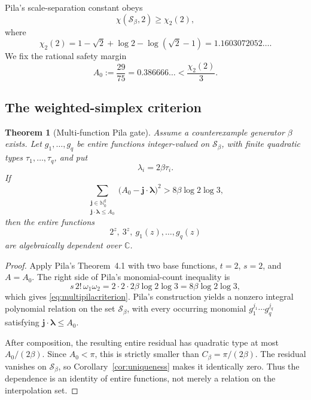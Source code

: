\documentclass[11pt,oneside]{article}
\newtheorem{theorem}{Theorem}[section]
\theoremstyle{definition}
\theoremstyle{remark}
\newcommand{\Nzero}{\mathbb N_0}
\newcommand{\C}{\mathbb C}
\newcommand{\Sbeta}{\mathcal S_\beta}
\newcommand{\Cbeta}{C_\beta}
\begin{document}
Pila's scale-separation constant obeys
\[
 \chi(\Sbeta,2)\ge\chi_2(2),
\]
where
\begin{equation}
 \chi_2(2)=
 1-\sqrt2+\log2-\log(\sqrt2-1)
 =1.1603072052\ldots.
 \label{eq:chi2}
\end{equation}
We fix the rational safety margin
\begin{equation}
 A_0:=\frac{29}{75}=0.386666\ldots
 <\frac{\chi_2(2)}3.
 \label{eq:A0}
\end{equation}

\subsection{The weighted-simplex criterion}

\begin{theorem}[Multi-function Pila gate]
\label{thm:multipila}
Assume a counterexample generator $\beta$ exists.  Let
$g_1,\dots,g_q$ be entire functions integer-valued on $\Sbeta$, with finite quadratic
types $\tau_1,\dots,\tau_q$, and put
\[
 \lambda_i=2\beta\tau_i.
\]
If
\begin{equation}
 \sum_{\substack{\mathbf j\in\Nzero^q\\
                  \mathbf j\cdot\boldsymbol\lambda\le A_0}}
 \bigl(A_0-\mathbf j\cdot\boldsymbol\lambda\bigr)^2
 >8\beta\log2\log3,
 \label{eq:multipilacriterion}
\end{equation}
then the entire functions
\[
 2^z,\ 3^z,\ g_1(z),\dots,g_q(z)
\]
are algebraically dependent over $\C$.
\end{theorem}

\begin{proof}
Apply Pila's Theorem~4.1 with two base functions, $t=2$, $s=2$, and $A=A_0$.  The
right side of Pila's monomial-count inequality is
\[
 s\,2!\,\omega_1\omega_2
 =2\cdot2\cdot2\beta\log2\log3
 =8\beta\log2\log3,
\]
which gives \eqref{eq:multipilacriterion}.  Pila's construction yields a nonzero integral
polynomial relation on the set $\Sbeta$, with every occurring monomial
$g_1^{j_1}\cdots g_q^{j_q}$ satisfying
$\mathbf j\cdot\boldsymbol\lambda\le A_0$.

After composition, the resulting entire residual has quadratic type at most
$A_0/(2\beta)$.  Since $A_0<\pi$, this is strictly smaller than
$\Cbeta=\pi/(2\beta)$.  The residual vanishes on $\Sbeta$, so
Corollary~\ref{cor:uniqueness} makes it identically zero.  Thus the dependence is an
identity of entire functions, not merely a relation on the interpolation set.
\end{proof}
\end{document}
